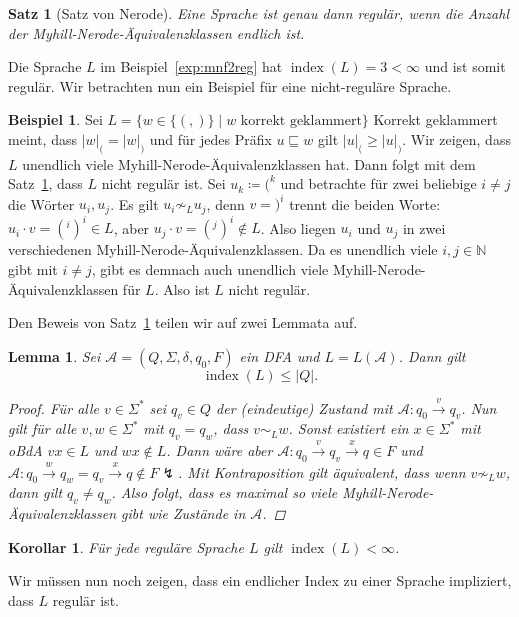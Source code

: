 \documentclass[11pt, a4paper]{article}
\theoremstyle{definition}
\newtheorem{example}[definition]{Beispiel}
\theoremstyle{plain}
\newtheorem{theorem}[definition]{Satz}
\newtheorem{lemma}[definition]{Lemma}
\newtheorem{corollary}[definition]{Korollar}
\numberwithin{equation}{section}
\newcommand{\reaches}{\xrightarrow}
\DeclareMathOperator{\ind}{index}
\begin{document}
\begin{theorem}[Satz von Nerode]\label{thm:nerode}
	Eine Sprache ist genau dann regulär, wenn die Anzahl der Myhill-Nerode-Äquivalenzklassen endlich ist.
\end{theorem}
Die Sprache $L$ im Beispiel~\ref{exp:mnf2reg} hat $\ind(L) = 3 < \infty$ und ist somit regulär. Wir betrachten nun ein Beispiel für eine nicht-reguläre Sprache.
\begin{example}
	Sei $L = \{w \in \{(, )\} \mid w \text{ korrekt geklammert}\}$ Korrekt geklammert meint, dass $|w|_( = |w|_)$ und für jedes Präfix $u \sqsubseteq w$ gilt $|u|_( \geq |u|_)$. Wir zeigen, dass $L$ unendlich viele Myhill-Nerode-Äquivalenzklassen hat. Dann folgt mit dem Satz~\ref{thm:nerode}, dass $L$ nicht regulär ist.
	Sei $u_k \coloneqq (^k$ und betrachte für zwei beliebige $i \neq j$ die Wörter $u_i, u_j$. Es gilt $u_i \not\sim_L u_j$, denn $v = )^i$ trennt die beiden Worte: $u_i \cdot v = (^i)^i \in L$, aber $u_j \cdot v = (^j)^i \notin L$. Also liegen $u_i$ und $u_j$ in zwei verschiedenen Myhill-Nerode-Äquivalenzklassen. Da es unendlich viele $i, j \in \mathbb{N}$ gibt mit $i \neq j$, gibt es demnach auch unendlich viele Myhill-Nerode-Äquivalenzklassen für $L$. Also ist $L$ nicht regulär.
\end{example}
Den Beweis von Satz~\ref{thm:nerode} teilen wir auf zwei Lemmata auf.
\begin{lemma}\label{lem:dfa2mnf}
	Sei $\mathcal{A} = (Q, \Sigma, \delta, q_0, F)$ ein DFA und $L = L(\mathcal{A})$. Dann gilt
	$$
		\ind(L) \leq |Q|.
	$$
	\begin{proof}
		Für alle $v \in \Sigma^\ast$ sei $q_v \in Q$ der (eindeutige) Zustand mit $\mathcal{A}: q_0 \reaches{v} q_v$. Nun gilt für alle $v, w \in \Sigma^\ast$ mit $q_v = q_w$, dass $v \sim_L w$. Sonst existiert ein $x \in \Sigma^\ast$ mit oBdA $vx \in L$ und $wx \notin L$. Dann wäre aber $\mathcal{A}: q_0 \reaches{v} q_v \reaches{x} q \in F$ und $\mathcal{A}: q_0 \reaches{w} q_w = q_v \reaches{x} q \notin F \lightning$. Mit Kontraposition gilt äquivalent, dass wenn $v \not\sim_L w$, dann gilt $q_v \neq q_w$. Also folgt, dass es maximal so viele Myhill-Nerode-Äquivalenzklassen gibt wie Zustände in $\mathcal{A}$.
	\end{proof}
\end{lemma}
\begin{corollary}\label{cor:reg2mnf}
	Für jede reguläre Sprache $L$ gilt $\ind(L) < \infty$.
\end{corollary}
Wir müssen nun noch zeigen, dass ein endlicher Index zu einer Sprache impliziert, dass $L$ regulär ist.
\end{document}
